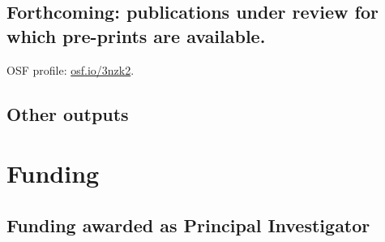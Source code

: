 \documentclass[10pt,a4paper,]{article}
\begin{document}
\nocite{langton2019cartograms,
solymosi2019exploring,
solymosi2018did,
solymosi2018role,
solymosi2017crowdsourcing,
solymosi2015mapping,
solymosi2015crowd}

\hypertarget{forthcoming-publications-under-review-for-which-pre-prints-are-available.}{%
\subsection{Forthcoming: publications under review for which pre-prints are available.}\label{forthcoming-publications-under-review-for-which-pre-prints-are-available.}}

OSF profile: \url{osf.io/3nzk2}.

\newrefcontext[sorting=none]\setcounter{papers}{0}\pagebreak[3]
\printbibliography[category=bib-forthcoming.bib-2913223,heading=none]\setcounter{papers}{0}

\nocite{buil2019non,
solymosi2019place,
solymosia2017alternative}

\hypertarget{other-outputs}{%
\subsection{Other outputs}\label{other-outputs}}

\newrefcontext[sorting=none]\setcounter{papers}{0}\pagebreak[3]
\printbibliography[category=bib-otherpubs.bib-2919700,heading=none]\setcounter{papers}{0}

\nocite{solymosi2019lse,
solymosi2019sagepub,
solymosi2019webinar,
solymosi2019ssi6,
solymosi2018ssi5,
solymosi2018ssi4,
solymosi2018ssi3,
solymosi2018ssi2,
solymosi2018ssi1,
solymosi2016confidence,
solymosia2014mapping,
solymosi2014tsc}

\hypertarget{funding}{%
\section{Funding}\label{funding}}

\hypertarget{funding-awarded-as-principal-investigator}{%
\subsection{Funding awarded as Principal Investigator}\label{funding-awarded-as-principal-investigator}}
\end{document}
